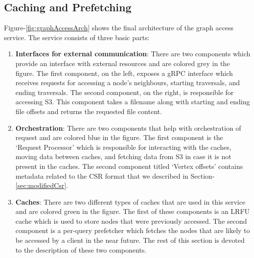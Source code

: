 \subsection{Caching and Prefetching}
Figure-\ref{fig:graphAccessArch} shows the final architecture of the graph
access service. The service consists of three basic parts:
\begin{enumerate}
    \item \textbf{Interfaces for external communication}: There are two 
        components which provide an interface with external resources and are
        colored grey in the figure. The first component, on the left,
        exposes a gRPC interface which receives requests for accessing a node's
        neighbours, starting traversals, and ending traversals. The second
        component, on the right, is responsible for accessing S3. This component
        takes a filename along with starting and ending file offsets and returns
        the requested file content.
    \item \textbf{Orchestration}: There are two components that help with
        orchestration of request and are colored blue in the figure. The first
        component is the `Request Processor' which is responsible for
        interacting with the caches, moving data between caches, and fetching
        data from S3 in case it is not present in the caches. The second
        component titled `Vertex offsets' contains metadata related to the CSR
        format that we described in Section-\ref{sec:modifiedCsr}.
    \item \textbf{Caches}: There are two different types of caches that are used
        in this service and are colored green in the figure. The first of these
        components is an LRFU cache which is used to store nodes that were
        previously accessed. The second component is a per-query prefetcher
        which fetches the nodes that are likely to be accessed by a client in
        the near future. The rest of this section is devoted to the description
        of these two components.
\end{enumerate}
